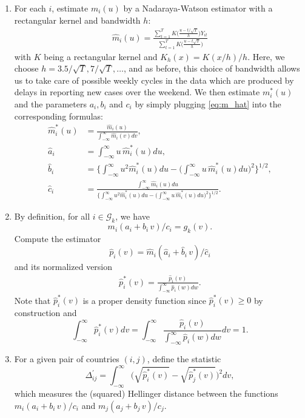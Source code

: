 \documentclass[a4paper,12pt]{article}
\numberwithin{equation}{section}
\begin{document}
\begin{enumerate}[label=\textit{Step \arabic*.},leftmargin=1.45cm]


\item For each $i$, estimate $m_i(u)$ by a Nadaraya-Watson estimator with a rectangular kernel and bandwidth $h$:
\begin{align}\label{eq:m_hat}
\hat{m}_i(u) =  \frac{ \sum_{t=1}^T K\Big( \frac{u - t/\sqrt{T}}{h}\Big) Y_{it}}{\sum_{t=1}^T K\Big( \frac{u - t\sqrt{T}}{h}\Big)}
\end{align}
with $K$ being a rectangular kernel and $K_h(x) = K(x/h)/h$. Here, we choose $h = 3.5/\sqrt{T}, 7/\sqrt{T}, \ldots$, and as before, this choice of bandwidth allows us to take care of possible weekly cycles in the data which are produced by delays in reporting new cases over the weekend.
We then estimate $m_i^*(u)$ and the parameters $a_i, b_i$ and $c_i$ by simply plugging \eqref{eq:m_hat} into the corresponding formulas:
\begin{align*}
\hat{m}_i^*(u) &= \frac{\hat{m}_i(u)}{\int_{-\infty}^\infty \hat{m}_i(v)dv}, \\
\hat{a}_i &= \int_{-\infty}^\infty u \, \hat{m}_i^*(u) du, \\
\hat{b}_i &= \bigg\{ \int_{-\infty}^\infty u^2 \hat{m}_i^*(u) du  - \Big(\int_{-\infty}^\infty u\, \hat{m}_i^*(u) du \Big)^2 \bigg\}^{1/2}, \\
\hat{c}_i & = \frac{\int_{-\infty}^\infty \hat{m}_i(u) du}{\Big\{ \int_{-\infty}^\infty u^2 \hat{m}_i^*(u) du  - \Big(\int_{-\infty}^\infty u\, \hat{m}_i^*(u) du \Big)^2 \Big\}^{1/2}}.
\end{align*}


\item By definition, for all $i \in \mathcal{G}_k$, we have
$$ m_i (a_i + b_i \, v)/c_i = g_k(v).$$
Compute the estimator
$$ \hat{p}_i(v) = \hat{m}_i (\hat{a}_i + \hat{b}_i \, v)/\hat{c}_i$$
and its normalized version
\begin{align} \label{eq:p_star_hat}
\hat{p}^*_i(v) = \frac{\hat{p}_i(v)}{\int_{-\infty}^{\infty} \hat{p}_i(w)dw}.
\end{align}
Note that $\hat{p}^*_i(v)$ is a proper density function since $\hat{p}^*_i(v) \geq 0$ by construction and 
$$ \int_{-\infty}^{\infty} \hat{p}^*_i(v)dv = \int_{-\infty}^{\infty}\frac{\hat{p}_i(v)}{\int_{-\infty}^{\infty} \hat{p}_i(w)dw}dv = 1.$$


\item For a given pair of countries $(i, j)$, define the statistic 
$$\Delta_{ij}^\prime = \int_{-\infty}^{\infty} \big( \sqrt{\hat{p}^*_i(v)} - \sqrt{\hat{p}^*_j(v)}\big)^2dv,$$
which measures the (squared) Hellinger distance between the functions \linebreak $m_i (a_i + b_i \, v)/c_i$ and $m_j (a_j + b_j\, v)/c_j$.



\end{enumerate}
\end{document}
